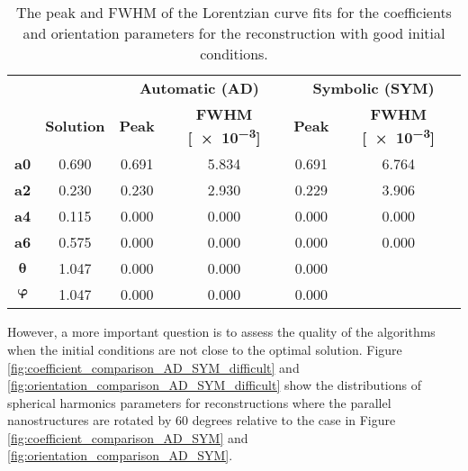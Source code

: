 \begin{table}
    \centering
    \caption{  The peak and FWHM of the Lorentzian curve fits
        for the coefficients and orientation parameters for the reconstruction
        with good initial conditions.}
    \label{tab:curve_fitting}
    \begin{tabular}{ c c c c c c }
        \hline %
        \textbf{}      &                   & \multicolumn{2}{c}{\textbf{Automatic (AD)}} & \multicolumn{2}{c}{\textbf{Symbolic (SYM)}}                                             \\
        \textbf{}      & \textbf{Solution} & \textbf{Peak}                               & \textbf{FWHM [\num{e-3}]}                   & \textbf{Peak} & \textbf{FWHM [\num{e-3}]} \\
        \hline %
        \textbf{a0}    & 0.690             & 0.691                                       & 5.834                                       & 0.691         & 6.764                     \\
        \textbf{a2}    & 0.230             & 0.230                                       & 2.930                                       & 0.229         & 3.906                     \\
        \textbf{a4}    & 0.115             & 0.000                                       & 0.000                                       & 0.000         & 0.000                     \\
        \textbf{a6}    & 0.575             & 0.000                                       & 0.000                                       & 0.000         & 0.000                     \\
        $\bm{\theta}$  & 1.047             & 0.000                                       & 0.000                                       & 0.000                                     \\
        $\bm{\varphi}$ & 1.047             & 0.000                                       & 0.000                                       & 0.000                                     \\
        \hline %
    \end{tabular}
\end{table}

However, a more important question is to assess the quality of the algorithms when the initial conditions are not close to the optimal solution.
Figure \ref{fig:coefficient_comparison_AD_SYM_difficult} and \ref{fig:orientation_comparison_AD_SYM_difficult} show the distributions of spherical harmonics parameters for reconstructions
where the parallel nanostructures are rotated by 60 degrees relative to the case in Figure \ref{fig:coefficient_comparison_AD_SYM} and \ref{fig:orientation_comparison_AD_SYM}.


